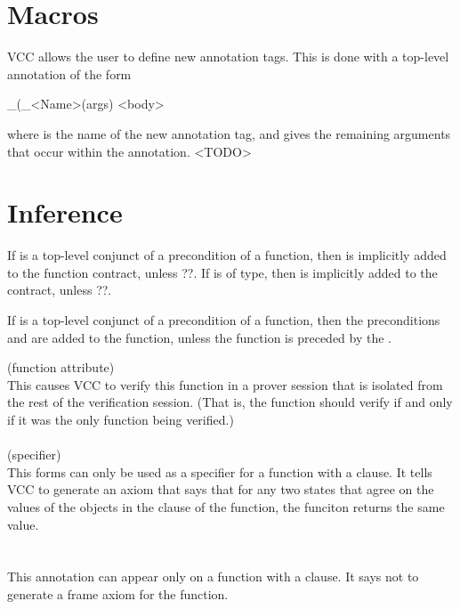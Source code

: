 \documentclass[preprint,nocopyrightspace]{sigplanconf}
\begin{document}
{{{{\begin{VCC}
\section{Macros}
VCC allows the user to define new annotation tags. This is done with
a top-level annotation of the form
\begin{VCC}
_(\bool \macro_<Name>(args) {
  <body>
}
\end{VCC}
where  is the name of the new annotation tag,
and  gives the remaining arguments that occur within the
annotation. <TODO>

\section{Inference}

If  is a top-level conjunct of a precondition of a
function, then   is implicitly added
to the function contract, unless ??. If  is of \vcc{\claim}
type, then  is implicitly added to
the contract, unless ??.

If  is a top-level conjunct of a
precondition of a function, then the
preconditions 
and  are added to the
function, unless the function is preceded by the .


 (function attribute)\\
This causes VCC to verify this function in a prover session that is
isolated from the rest of the verification session. (That is, the
function should verify if and only if it was the only function being verified.)
\\\\
 (specifier)\\
This forms can only be used as a specifier for a   function
with a  clause. It tells VCC to generate an axiom that says
that for any two states that agree on the values of the objects in the
 clause of the function, the funciton returns the same
value.
\\\\
\\
This annotation can appear only on a  function with
a  clause. It says not to generate a frame axiom for the
function. 




\end{VCC}}}}}
\end{document}
